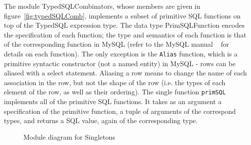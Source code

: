         
        The module TypedSQLCombinators, whose members are given in 
        figure~\ref{fig:typedSQLComb},
        implements a subset of primitive SQL functions on top of the TypedSQL 
        expression type. 
        The data type PrimSQLFunction encodes the specification of each 
        function; the type
        and semantics of each function is that of the corresponding function in 
        MySQL (refer to
        the MySQL manual ~\cite{mySQLman} for details on each function). The 
        only exception
        is the \lstinline{Alias} function, which is a primitive syntactic 
        constructor (not a named entity)
        in MySQL - rows can be aliased with a select statement. Aliasing a row 
        means to change
        the name of each association in the row, but not the shape of the row 
        (i.e. the types of
        each element of the row, as well as their ordering). The single 
        function \lstinline{primSQL}
        implements all of the primitive SQL functions. It takes as an argument 
        a specification
        of the primitive function, a tuple of arguments of the correspond 
        types, and returns
        a SQL value, again of the corresponding type. 
        
        
        
        \begin{figure}[!ht]
            \caption{Module diagram for Singletons} \label{fig:singletons}
            \end{figure}
            
